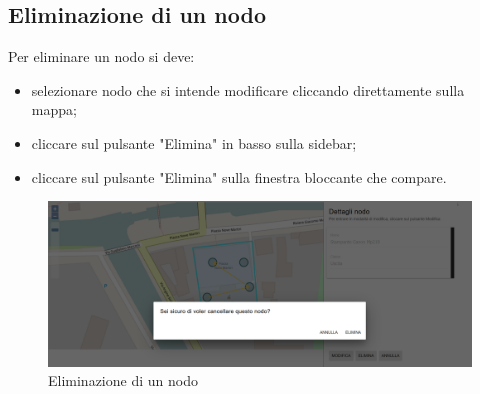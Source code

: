 \subsection{Eliminazione di un nodo}
Per eliminare un nodo si deve:
\begin{itemize}
	\item selezionare  nodo che si intende modificare cliccando direttamente sulla mappa;
	\item cliccare sul pulsante "Elimina" in basso sulla sidebar;
	\item cliccare sul pulsante "Elimina" sulla finestra bloccante che compare.
\end{itemize}

\begin{figure}[H]
\centering
\includegraphics[width=\textwidth]{img/eliminazione_bloccante_nodo.png}
\caption{Eliminazione di un nodo}
\end{figure}